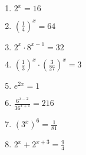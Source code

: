 \begin{multicols}{3}
\begin{enumerate}
\item $2^x=16$
\item $\left(\frac{1}{4}\right)^x = 64$
\item $2^x\cdot 8^{x-1} = 32$
  \item $\left(\frac{1}{3}\right)^x\cdot \left(\frac{3}{27}\right)^x = 3$
  \item $e^{2x}=1$
  \item $\frac{6^{x-2}}{36^{x+1}} = 216$
  \item $\left(3^x\right)^6=\frac{1}{81}$
    \item $2^x + 2^{x+3} = \frac{9}{4}$
  \end{enumerate}
\end{multicols}

